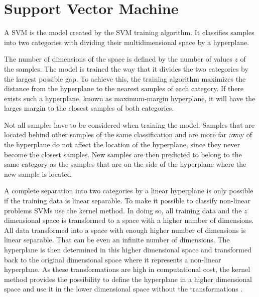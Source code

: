 
\section{Support Vector Machine}
\label{sec:svm}

A \acf{SVM} is the model created by the \ac{SVM} training algorithm.
It classifies samples into two categories with dividing their multidimensional space by a hyperplane. %

The number of dimensions of the space is defined by the number of values $z$ of the samples.
The model is trained the way that it divides the two categories by the largest possible gap. %
To achieve this, the training algorithm maximizes the distance from the hyperplane to the nearest samples of each category.
If there exists such a hyperplane, known as maximum-margin hyperplane, it will have the larges margin to the closest samples of both categories. %

Not all samples have to be considered when training the model.
Samples that are located behind other samples of the same classification and are more far away of the hyperplane do not affect the location of the hyperplane, since they never become the closest samples. %
New samples are then predicted to belong to the same category as the samples that are on the side of the hyperplane where the new sample is located.

A complete separation into two categories by a linear hyperplane is only possible if the training data is linear separable.
To make it possible to classify non-linear problems \acp{SVM} use the kernel method. %
In doing so, all training data and the $z$ dimensional space is transformed to a space with a higher number of dimensions.
All data transformed into a space with enough higher number of dimensions is linear separable.
That can be even an infinite number of dimensions. %
The hyperplane is then determined in this higher dimensional space and transformed back to the original dimensional space where it represents a non-linear hyperplane. %
As these transformations are high in computational cost, the kernel method provides the possibility to define the hyperplane in a higher dimensional space and use it in the lower dimensional space without the transformations \cite{Cristianini2000AnMethods}.

